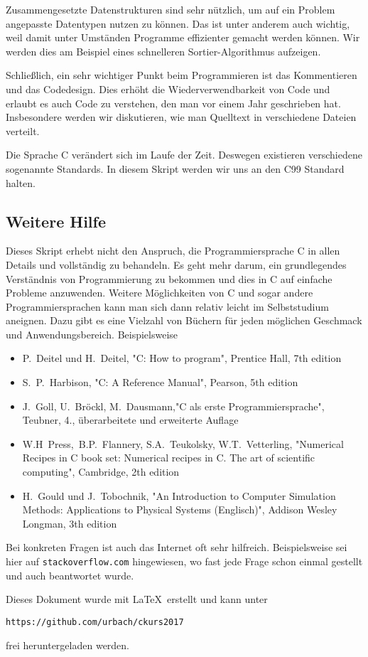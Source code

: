 Zusammengesetzte Datenstrukturen sind sehr nützlich, um auf ein Problem angepasste Datentypen nutzen zu können. 
Das ist unter anderem auch wichtig, weil damit unter Umständen Programme effizienter gemacht werden können.
Wir werden dies am Beispiel eines schnelleren Sortier-Algorithmus aufzeigen.

Schließlich, ein sehr wichtiger Punkt beim Programmieren ist das Kommentieren und das Codedesign.
Dies erhöht die Wiederverwendbarkeit von Code und erlaubt es auch Code zu verstehen, den man vor einem Jahr geschrieben hat.
Insbesondere werden wir diskutieren, wie man Quelltext in verschiedene Dateien verteilt.

Die Sprache C verändert sich im Laufe der Zeit.
Deswegen existieren verschiedene sogenannte Standards.
In diesem Skript werden wir uns an den C99 Standard halten.

\subsection{Weitere Hilfe}

Dieses Skript erhebt nicht den Anspruch, die Programmiersprache C in allen Details und vollständig zu behandeln.
Es geht mehr darum, ein grundlegendes Verständnis von Programmierung zu bekommen und dies in C auf einfache Probleme anzuwenden.
Weitere Möglichkeiten von C und sogar andere Programmiersprachen kann man sich dann relativ leicht im Selbststudium aneignen.
Dazu gibt es eine Vielzahl von Büchern für jeden möglichen Geschmack und Anwendungsbereich.
Beispielsweise
\begin{itemize}
\item P.~Deitel und H.~Deitel, "C: How to program", Prentice Hall, 7th edition
\item S.~P.~Harbison, "C: A Reference Manual", Pearson, 5th edition
\item J.~Goll, U.~Bröckl, M.~Dausmann,"C als erste Programmiersprache", Teubner, 4., überarbeitete und erweiterte Auflage
\item W.H~Press,~B.P.~Flannery, S.A.~Teukolsky, W.T.~Vetterling, "Numerical Recipes in C book set: Numerical recipes in C. The art of scientific computing", Cambridge, 2th edition
\item H.~Gould und J.~Tobochnik, "{}An Introduction to Computer Simulation Methods: Applications to Physical Systems (Englisch)", Addison Wesley Longman, 3th edition
\end{itemize}
Bei konkreten Fragen ist auch das Internet oft sehr hilfreich.
Beispielsweise sei hier auf \texttt{stackoverflow.com} hingewiesen, wo fast jede Frage schon einmal gestellt und auch beantwortet wurde.

Dieses Dokument wurde mit \LaTeX\ erstellt und kann unter 
\begin{center}
  \texttt{https://github.com/urbach/ckurs2017} 
\end{center}
frei heruntergeladen werden.
